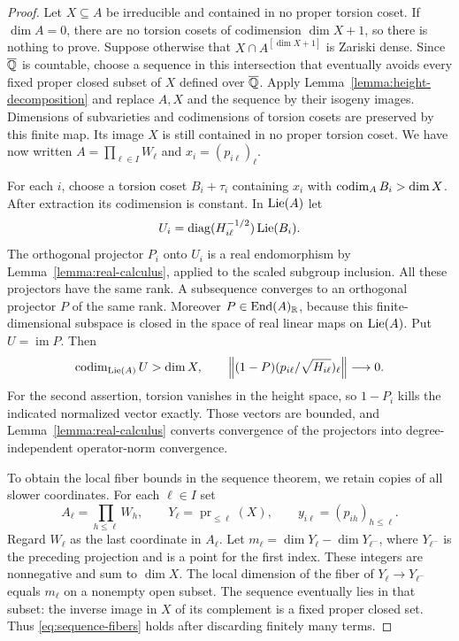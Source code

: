 \begin{proof}
Let $X\subseteq A$ be irreducible and contained in no proper torsion
coset. If $\dim A=0$, there are no torsion cosets of codimension
$\dim X+1$, so there is nothing to prove. Suppose otherwise that
$X\cap A^{[\dim X+1]}$ is Zariski dense. Since $\overline{\mathbb Q}$ is
countable, choose a sequence in this intersection that eventually
avoids every fixed proper closed subset of $X$ defined over $\overline{\mathbb Q}$.
Apply Lemma~\ref{lemma:height-decomposition} and replace $A,X$ and
the sequence by their isogeny images. Dimensions of subvarieties and
codimensions of torsion cosets are preserved by this finite map. Its
image $X$ is still contained in no proper torsion coset. We have now
written $A=\prod_{\ell\in I}W_\ell$ and
$x_i=(p_{i\ell})_\ell$.

For each $i$, choose a torsion coset $B_i+\tau_i$ containing $x_i$
with $\operatorname{codim}_A B_i>\dim X$. After extraction its codimension is
constant. In $\operatorname{Lie}(A)$ let
\[
 U_i=\operatorname{diag}(H_{i\ell}^{-1/2})\operatorname{Lie}(B_i).
\]
The orthogonal projector $P_i$ onto $U_i$ is a real endomorphism by
Lemma~\ref{lemma:real-calculus}, applied to the scaled subgroup
inclusion. All these projectors have the same rank. A subsequence
converges to an orthogonal projector $P$ of the same rank. Moreover
$P\in\operatorname{End}(A)_{\mathbb R}$, because this finite-dimensional
subspace is closed in the space of real linear maps on $\operatorname{Lie}(A)$.
Put $U=\operatorname{im}P$. Then
\begin{equation}
 \label{eq:initial-limit-projector}
 \operatorname{codim}_{\operatorname{Lie}(A)}U>\dim X,
 \qquad
 \left\|(1-P)(p_{i\ell}/\sqrt{H_{i\ell}})_\ell\right\|
 \longrightarrow0.
\end{equation}
For the second assertion, torsion vanishes in the height space, so
$1-P_i$ kills the indicated normalized vector exactly. Those vectors
are bounded, and Lemma~\ref{lemma:real-calculus} converts convergence
of the projectors into degree-independent operator-norm convergence.

To obtain the local fiber bounds in the sequence theorem, we retain
copies of all slower coordinates. For each $\ell\in I$ set
\[
 A_\ell=\prod_{h\le\ell}W_h,
 \qquad Y_\ell=\operatorname{pr}_{\le\ell}(X),
 \qquad y_{i\ell}=(p_{ih})_{h\le\ell}.
\]
Regard $W_\ell$ as the last coordinate in $A_\ell$. Let
$m_\ell=\dim Y_\ell-\dim Y_{\ell^-}$, where $Y_{\ell^-}$ is
the preceding projection and is a point for the first index. These
integers are nonnegative and sum to $\dim X$. The local dimension of
the fiber of $Y_\ell\to Y_{\ell^-}$ equals $m_\ell$ on a
nonempty open subset. The sequence eventually lies in that subset:
the inverse image in $X$ of its complement is a fixed proper closed
set. Thus \eqref{eq:sequence-fibers} holds after discarding finitely
many terms.


\end{proof}
